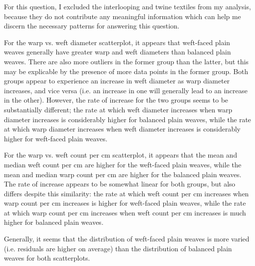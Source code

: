 \documentclass[answers]{exam}
\begin{document}
\begin{parts}
\quad\quad\color{nr} For this question, I excluded the interlooping and twine textiles from my analysis, because they do not contribute any meaningful information which can help me discern the necessary patterns for answering this question.
\color{black}\begin{center}
\color{nr}
\end{center}


\color{nr}\quad\quad For the warp vs. weft diameter scatterplot, it appears that weft-faced plain weaves generally have greater warp and weft diameters than balanced plain weaves. There are also more outliers in the former group than the latter, but this may be explicable by the presence of more data points in the former group. Both groups appear to experience an increase in weft diameter as warp diameter increases, and vice versa (i.e. an increase in one will generally lead to an increase in the other). However, the rate of increase for the two groups seems to be substantially different; the rate at which weft diameter increases when warp diameter increases is considerably higher for balanced plain weaves, while the rate at which warp diameter increases when weft diameter increases is considerably higher for weft-faced plain weaves.

\color{black}\begin{center}
\end{center}
\color{nr}

\quad\quad For the warp vs. weft count per cm scatterplot, it appears that the mean and median weft count per cm are higher for the weft-faced plain weaves, while the mean and median warp count per cm are higher for the balanced plain weaves. The rate of increase appears to be somewhat linear for both groups, but also differs despite this similarity: the rate at which weft count per cm increases when warp count per cm increases is higher for weft-faced plain weaves, while the rate at which warp count per cm increases when weft count per cm increases is much higher for balanced plain weaves.

\quad\quad Generally, it seems that the distribution of weft-faced plain weaves is more varied (i.e. residuals are higher on average) than the distribution of balanced plain weaves for both scatterplots.
\end{parts}
\end{document}
